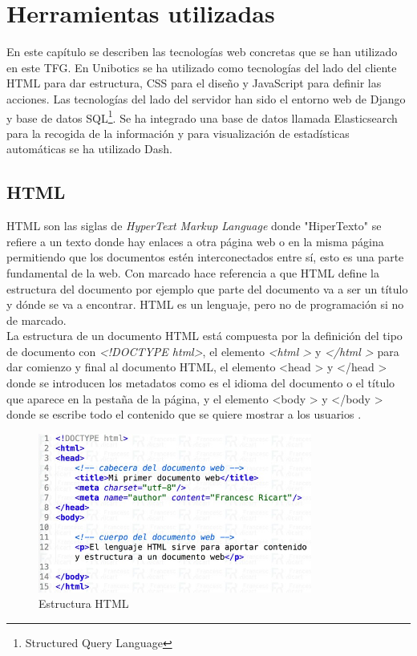 \chapter{Herramientas utilizadas}
\label{herramientas}
En este capítulo se describen las tecnologías web concretas que se han utilizado en este TFG. En Unibotics se ha utilizado como tecnologías del lado del cliente HTML para dar estructura, CSS para el diseño y JavaScript para definir las acciones. Las tecnologías del lado del servidor han sido el entorno web de Django y base de datos SQL\footnote{Structured Query Language}. Se ha integrado una base de datos llamada Elasticsearch para la recogida de la información y para visualización de estadísticas automáticas se ha utilizado Dash.

\section{HTML}
HTML son las siglas de \textit{HyperText Markup Language} donde "HiperTexto" se refiere a un texto donde hay enlaces a otra página web o en la misma página permitiendo que los documentos estén interconectados entre sí, esto es una parte fundamental de la web. Con marcado hace referencia a que HTML define la estructura del documento por ejemplo que parte del documento va a ser un título y dónde se va a encontrar. HTML es un lenguaje, pero no de programación si no de marcado.\\

La estructura de un documento HTML está compuesta por la definición del tipo de documento con \textit{\textless!DOCTYPE html\textgreater}, el elemento  \textit{\textless html \textgreater} y \textit{\textless/html \textgreater} para dar comienzo y final al documento HTML, el elemento {\textless head \textgreater} y {\textless/head \textgreater} donde se introducen los metadatos como es el idioma del documento o el título que aparece en la pestaña de la página, y el elemento {\textless body \textgreater} y {\textless/body \textgreater} donde se escribe todo el contenido que se quiere mostrar a los usuarios \cite{html}.

\begin{figure}[H]
    \centering
    \includegraphics[width=9cm, keepaspectratio]{img/html.jpg}
    \caption{Estructura HTML}
    \label{fig:html}
\end{figure}

